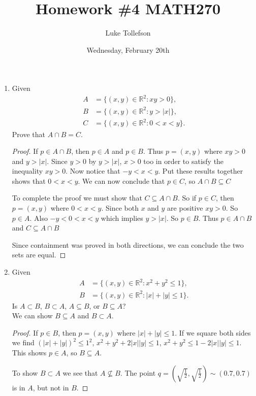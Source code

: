 \documentclass[12pt]{article}
\begin{document}
	\title{\Large Homework \#4 MATH270}
	\author{Luke Tollefson}
	\date{Wednesday, February 20th}
	
	\maketitle
	
	\begin{enumerate}
		\item Given
		\begin{align*}
			A&=\{(x,y)\in \mathbb{R}^2 : xy>0\},\\
			B&=\{(x,y)\in \mathbb{R}^2 : y>|x|\},\\
			C&=\{(x,y)\in \mathbb{R}^2 : 0<x<y\}.
		\end{align*}
		Prove that $A\cap B=C$.	
	
		\begin{proof}
			If $p\in A\cap B$, then $p\in A$ and $p\in B$. Thus $p=(x,y)$ where $xy>0$ and $y>|x|$. Since $y>0$ by $y>|x|$, $x>0$ too in order to satisfy the inequality $xy>0$. Now notice that $-y<x<y$. Put these results together shows that $0<x<y$. We can now conclude that $p\in C$, so $A\cap B\subseteq C$
			
			To complete the proof we must show that $C\subseteq A\cap B$. So if $p\in C$, then $p=(x,y)$ where $0<x<y$. Since both $x$ and $y$ are positive $xy>0$. So $p\in A$. Also $-y<0<x<y$ which implies $y>|x|$. So $p\in B$. Thus $p\in A\cap B$ and $C\subseteq A\cap B$
			
			Since containment was proved in both directions, we can conclude the two sets are equal.
		\end{proof}
	
		\item Given
		\begin{align*}
			A&=\{(x,y)\in \mathbb{R}^2 : x^2+y^2\leq 1\},\\
			B&=\{(x,y)\in \mathbb{R}^2 : |x|+|y|\leq 1\}.
		\end{align*}
		Is $A\subset B$, $B\subset A$, $A\subseteq B$, or $B\subseteq A$?\\
		
		\noindent We can show $B\subseteq A$ and $B\subset A$.
		\begin{proof}
			If $p\in B$, then $p=(x,y)$ where $|x|+|y|\leq 1$. If we square both sides we find $(|x|+|y|)^2\leq 1^2$, $x^2+y^2+2|x||y|\leq 1$, $x^2+y^2\leq 1-2|x||y|\leq 1$. This shows $p\in A$, so $B\subseteq A$.
			
			To show $B\subset A$ we see that $A\not\subseteq B$. The point $q=(\sqrt{\frac{1}{2}},\sqrt{\frac{1}{2}})\sim (0.7,0.7)$ is in $A$, but not in $B$.
			

\end{proof}
\end{enumerate}
\end{document}

